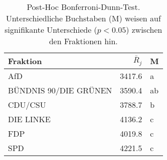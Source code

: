 \begin{table}[ht]
\centering
\begin{tabular}{lrl}
  \hline
Fraktion & $\bar{R}_{j}$ & M \\ 
  \hline
AfD & 3417.6 & a \\ 
  BÜNDNIS 90/DIE GRÜNEN & 3590.4 & ab \\ 
  CDU/CSU & 3788.7 & b \\ 
  DIE LINKE & 4136.2 & c \\ 
  FDP & 4019.8 & c \\ 
  SPD & 4221.5 & c \\ 
   \hline
\end{tabular}
\caption[Post-Hoc Bonferroni-Dunn-Test]{Post-Hoc Bonferroni-Dunn-Test. Unterschiedliche Buchstaben (M) 
weisen auf signifikante Unterschiede ($p < 0.05$) zwischen den Fraktionen hin.} 
\label{table:dunn-test}
\end{table}
